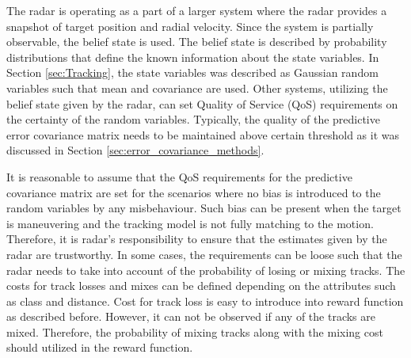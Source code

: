 \documentclass[english, 12pt, a4paper, elec, utf8, a-1b, online]{aaltothesis}
\begin{document}
The radar is operating as a part of a larger system where the radar provides a snapshot of target position and radial velocity.
Since the system is partially observable, the belief state is used.
The belief state is described by probability distributions that define the known information about the state variables.
In Section \ref{sec:Tracking}, the state variables was described as Gaussian random variables such that mean and covariance are used.
Other systems, utilizing the belief state given by the radar, can set Quality of Service (QoS) requirements on the certainty of the random variables.
Typically, the quality of the predictive error covariance matrix needs to be maintained above certain threshold as it was discussed in Section \ref{sec:error_covariance_methods}.

It is reasonable to assume that the QoS requirements for the predictive covariance matrix are set for the scenarios where no bias is introduced to the random variables by any misbehaviour.
Such bias can be present when the target is maneuvering and the tracking model is not fully matching to the motion.
Therefore, it is radar's responsibility to ensure that the estimates given by the radar are trustworthy.
In some cases, the requirements can be loose such that the radar needs to take into account of the probability of losing or mixing tracks.
The costs for track losses and mixes can be defined depending on the attributes such as class and distance.
Cost for track loss is easy to introduce into reward function as described before.
However, it can not be observed if any of the tracks are mixed.
Therefore, the probability of mixing tracks along with the mixing cost should utilized in the reward function.
\end{document}
